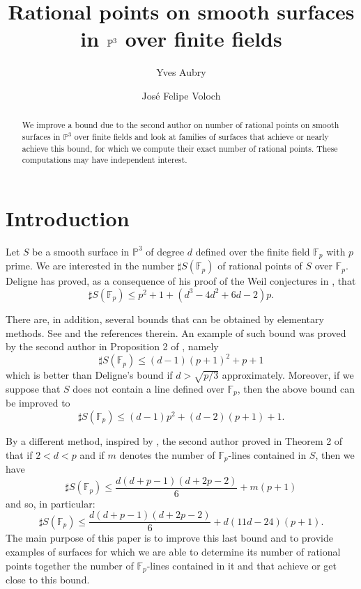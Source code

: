 \documentclass[12pt]{amsart}
\author[Aubry]{Yves Aubry}
\author[Voloch]{Jos\'e Felipe Voloch}
\title{Rational points on smooth surfaces in $\PP^3$ over finite fields}
\theoremstyle{definition}
\newcommand{\PP}{{\mathbb P}}
\def\PP{\mathbb{P}}
\begin{document}
\begin{abstract}
We improve a bound due to the second author on number of rational points on smooth surfaces in $\PP^3$ over finite fields and look at families of surfaces that achieve or nearly achieve this bound, for which we compute their exact number of rational points. These computations may have independent interest.
\end{abstract}



\maketitle




\section{Introduction}

Let $S$ be  a smooth surface in $\PP^3$ of degree $d$ defined over the finite field ${\mathbb F}_p$ with $p$ prime.
We are interested in the number $\sharp S({\mathbb F}_p)$ of rational points of $S$ over ${\mathbb F}_p$.
Deligne has proved, as a consequence of his proof of the Weil conjectures in \cite{Deligne}, that
$$\sharp S({\mathbb F}_p) \leq p^2+1 +(d^3-4d^2+6d-2)p.$$

There are, in addition, several bounds that can be obtained by elementary methods. See \cites{Homma-Kim-1,Homma-Kim-2} and the references therein. An example of such bound was proved by the second author in Proposition 2 of \cite{Voloch}, namely
$$\sharp S({\mathbb F}_p) \leq (d-1)(p+1)^2+p+1$$
which is better than Deligne's bound if $d>\sqrt{p/3}$ approximately.
Moreover, if we suppose that $S$ does not contain a line defined over ${\mathbb F}_p$, then the above bound can be improved to
$$\sharp S({\mathbb F}_p) \leq (d-1)p^2+(d-2)(p+1)+1.$$

By a different method, inspired by \cite{SV}, the second author proved in Theorem 2 of \cite{Voloch} that if $2<d<p$ and if $m$ denotes the number of ${\mathbb F}_p$-lines contained in 
$S$, then we have
\begin{equation}\label{Felipe}
\sharp S({\mathbb F}_p) \leq \frac{d(d+p-1)(d+2p-2)}{6}+m(p+1)
\end{equation}
and so, in particular:
\begin{equation}\label{Felipe_plus}
\sharp S({\mathbb F}_p) \leq \frac{d(d+p-1)(d+2p-2)}{6}+d(11d-24)(p+1).
\end{equation}
The main purpose of this paper is to improve this last bound and to provide examples of surfaces for which we are able to determine its number of rational points together the number of ${\mathbb F}_p$-lines contained in it and that achieve or get close to this bound.  
\end{document}
